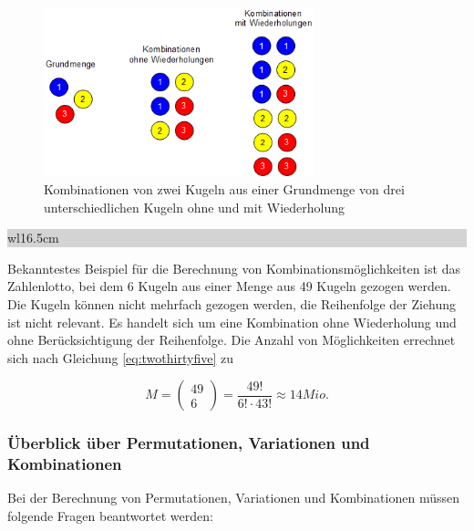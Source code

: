 \noindent 
\begin{figure}[H]
  \centerline{\includegraphics[width=0.7\textwidth]{Kapitel2/Bilder/image5}}
  \caption{Kombinationen von zwei Kugeln aus einer Grundmenge von drei unterschiedlichen Kugeln ohne und mit Wiederholung}
  \label{fig:Kombinationen}
\end{figure}

\noindent
\colorbox{lightgray}{%
%
\renewcommand\arraystretch{0.6}%
\begin{tabular}{ wl{16.5cm} }
{\selectfont
{}}
\end{tabular}%
}\bigskip

\noindent Bekanntestes Beispiel f\"{u}r die Berechnung von Kombinationsm\"{o}glichkeiten ist das Zahlenlotto, bei dem 6 Kugeln aus einer Menge aus 49 Kugeln gezogen werden. Die Kugeln k\"{o}nnen nicht mehrfach gezogen werden, die Reihenfolge der Ziehung ist nicht relevant. Es handelt sich um eine Kombination ohne Wiederholung und ohne Ber\"{u}cksichtigung der Reihenfolge. Die Anzahl von M\"{o}glichkeiten errechnet sich nach Gleichung \eqref{eq:twothirtyfive} zu

\begin{equation}\label{eq:twothirtyfive}
M=(\begin{array}{c} {49} \\ {6} \end{array})=\dfrac{49!}{6!\cdot 43!} \approx 14 Mio.
\end{equation}

\subsubsection{Überblick über Permutationen, Variationen und Kombinationen}

\noindent Bei der Berechnung von Permutationen, Variationen und Kombinationen m\"{u}ssen folgende Fragen beantwortet werden:


